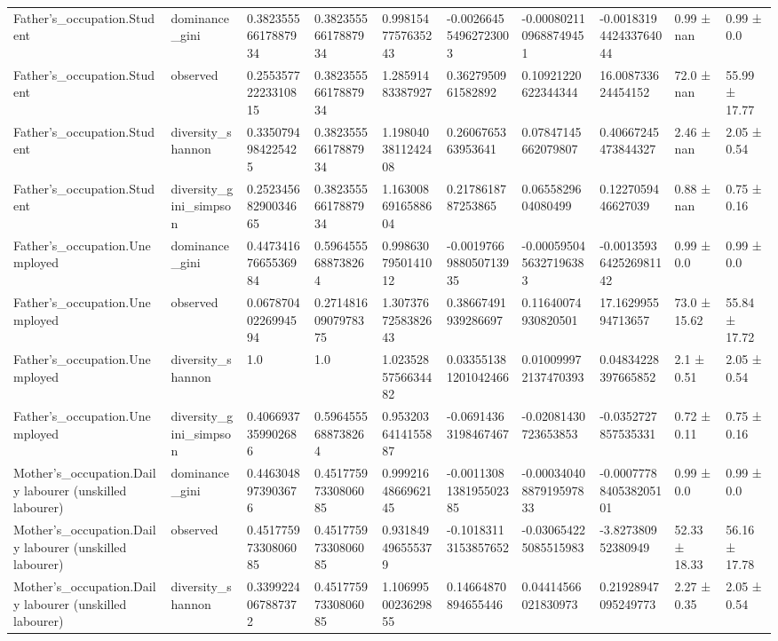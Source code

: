 \begin{longtable}{llllllllll}
Father’s\_occupation.Student & dominance\_gini & 0.38235556617887934 & 0.38235556617887934 & 0.9981547757635243 & -0.002664554962723003 & -0.0008021109688749451 & -0.0018319442433764044 & 0.99 ± nan & 0.99 ± 0.0 \\
Father’s\_occupation.Student & observed & 0.25535772223310815 & 0.38235556617887934 & 1.28591483387927 & 0.3627950961582892 & 0.10921220622344344 & 16.008733624454152 & 72.0 ± nan & 55.99 ± 17.77 \\
Father’s\_occupation.Student & diversity\_shannon & 0.3350794984225425 & 0.38235556617887934 & 1.1980403811242408 & 0.2606765363953641 & 0.07847145662079807 & 0.40667245473844327 & 2.46 ± nan & 2.05 ± 0.54 \\
Father’s\_occupation.Student & diversity\_gini\_simpson & 0.25234568290034665 & 0.38235556617887934 & 1.1630086916588604 & 0.2178618787253865 & 0.0655829604080499 & 0.1227059446627039 & 0.88 ± nan & 0.75 ± 0.16 \\
Father’s\_occupation.Unemployed & dominance\_gini & 0.44734167665536984 & 0.5964555688738264 & 0.9986307950141012 & -0.0019766988050713935 & -0.0005950456327196383 & -0.0013593642526981142 & 0.99 ± 0.0 & 0.99 ± 0.0 \\
Father’s\_occupation.Unemployed & observed & 0.06787040226994594 & 0.27148160907978375 & 1.3073767258382643 & 0.38667491939286697 & 0.11640074930820501 & 17.162995594713657 & 73.0 ± 15.62 & 55.84 ± 17.72 \\
Father’s\_occupation.Unemployed & diversity\_shannon & 1.0 & 1.0 & 1.0235285756634482 & 0.033551381201042466 & 0.010099972137470393 & 0.04834228397665852 & 2.1 ± 0.51 & 2.05 ± 0.54 \\
Father’s\_occupation.Unemployed & diversity\_gini\_simpson & 0.4066937359902686 & 0.5964555688738264 & 0.9532036414155887 & -0.06914363198467467 & -0.02081430723653853 & -0.0352727857535331 & 0.72 ± 0.11 & 0.75 ± 0.16 \\
Mother’s\_occupation.Daily labourer (unskilled labourer) & dominance\_gini & 0.4463048973903676 & 0.45177597330806085 & 0.9992164866962145 & -0.0011308138195502385 & -0.00034040887919597833 & -0.0007778840538205101 & 0.99 ± 0.0 & 0.99 ± 0.0 \\
Mother’s\_occupation.Daily labourer (unskilled labourer) & observed & 0.45177597330806085 & 0.45177597330806085 & 0.931849496555379 & -0.10183113153857652 & -0.030654225085515983 & -3.827380952380949 & 52.33 ± 18.33 & 56.16 ± 17.78 \\
Mother’s\_occupation.Daily labourer (unskilled labourer) & diversity\_shannon & 0.3399224067887372 & 0.45177597330806085 & 1.1069950023629855 & 0.14664870894655446 & 0.04414566021830973 & 0.21928947095249773 & 2.27 ± 0.35 & 2.05 ± 0.54 \\

\end{longtable}
